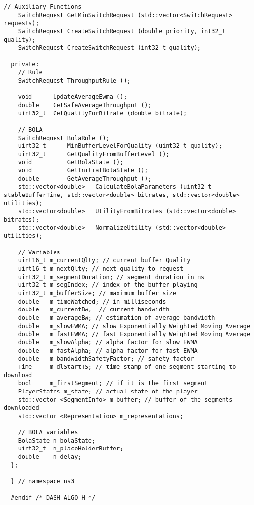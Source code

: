 \begin{lstlisting}[language=myC++, caption={DASHjs.h}, captionpos=b]
    // Auxiliary Functions
    SwitchRequest GetMinSwitchRequest (std::vector<SwitchRequest> requests);
    SwitchRequest CreateSwitchRequest (double priority, int32_t quality);
    SwitchRequest CreateSwitchRequest (int32_t quality);
  
  private:
    // Rule
    SwitchRequest ThroughputRule ();
  
    void      UpdateAverageEwma ();
    double    GetSafeAverageThroughput ();
    uint32_t  GetQualityForBitrate (double bitrate);
  
    // BOLA
    SwitchRequest BolaRule ();
    uint32_t      MinBufferLevelForQuality (uint32_t quality);
    uint32_t      GetQualityFromBufferLevel ();
    void          GetBolaState ();
    void          GetInitialBolaState ();
    double        GetAverageThroughput ();
    std::vector<double>   CalculateBolaParameters (uint32_t stableBufferTime, std::vector<double> bitrates, std::vector<double> utilities);
    std::vector<double>   UtilityFromBitrates (std::vector<double> bitrates);
    std::vector<double>   NormalizeUtility (std::vector<double> utilities);
  
    // Variables
    uint16_t m_currentQlty; // current buffer Quality
    uint16_t m_nextQlty; // next quality to request
    uint32_t m_segmentDuration; // segment duration in ms
    uint32_t m_segIndex; // index of the buffer playing
    uint32_t m_bufferSize; // maximum buffer size
    double   m_timeWatched; // in milliseconds
    double   m_currentBw;  // current bandwidth
    double   m_averageBw; // estimation of average bandwidth
    double   m_slowEWMA; // slow Exponentially Weighted Moving Average
    double   m_fastEWMA; // fast Exponentially Weighted Moving Average
    double   m_slowAlpha; // alpha factor for slow EWMA
    double   m_fastAlpha; // alpha factor for fast EWMA
    double   m_bandwidthSafetyFactor; // safety factor
    Time     m_dlStartTS; // time stamp of one segment starting to download
    bool     m_firstSegment; // if it is the first segment
    PlayerStates m_state; // actual state of the player
    std::vector <SegmentInfo> m_buffer; // buffer of the segments downloaded
    std::vector <Representation> m_representations;
  
    // BOLA variables
    BolaState m_bolaState;
    uint32_t  m_placeHolderBuffer;
    double    m_delay;
  };
  
  } // namespace ns3
  
  #endif /* DASH_ALGO_H */
\end{lstlisting}

